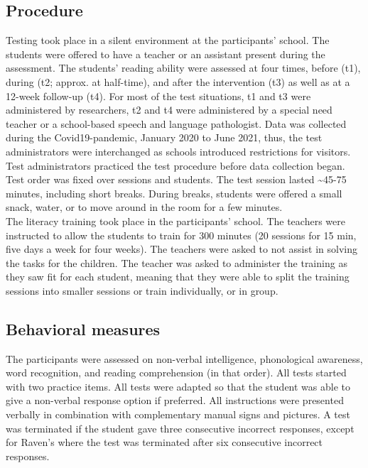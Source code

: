 \documentclass[
  ,
]{article}
\begin{document}
\hypertarget{procedure}{%
\subsection{Procedure}\label{procedure}}

Testing took place in a silent environment at the participants' school.
The students were offered to have a teacher or an assistant present
during the assessment. The students' reading ability were assessed at
four times, before (t1), during (t2; approx. at half-time), and after
the intervention (t3) as well as at a 12-week follow-up (t4). For most
of the test situations, t1 and t3 were administered by researchers, t2
and t4 were administered by a special need teacher or a school-based
speech and language pathologist. Data was collected during the
Covid19-pandemic, January 2020 to June 2021, thus, the test
administrators were interchanged as schools introduced restrictions for
visitors. Test administrators practiced the test procedure before data
collection began. Test order was fixed over sessions and students. The
test session lasted \textasciitilde45-75 minutes, including short
breaks. During breaks, students were offered a small snack, water, or to
move around in the room for a few minutes.\\
The literacy training took place in the participants' school. The
teachers were instructed to allow the students to train for 300 minutes
(20 sessions for 15 min, five days a week for four weeks). The teachers
were asked to not assist in solving the tasks for the children. The
teacher was asked to administer the training as they saw fit for each
student, meaning that they were able to split the training sessions into
smaller sessions or train individually, or in group.

\hypertarget{behavioral-measures}{%
\subsection{Behavioral measures}\label{behavioral-measures}}

The participants were assessed on non-verbal intelligence, phonological
awareness, word recognition, and reading comprehension (in that order).
All tests started with two practice items. All tests were adapted so
that the student was able to give a non-verbal response option if
preferred. All instructions were presented verbally in combination with
complementary manual signs and pictures. A test was terminated if the
student gave three consecutive incorrect responses, except for Raven's
where the test was terminated after six consecutive incorrect responses.
\end{document}
